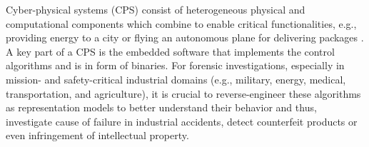 \documentclass[10pt,conference]{IEEEtran}
\renewcommand{\hl}[1]{#1}
\newcommand{\citeme}[1]{%
  \begingroup
  \definecolor{hlcolor}{RGB}{255, 226, 176}\sethlcolor{hlcolor}%
  [\textcolor{orange}{\hl{\textbf{CITE}}}]%
  \endgroup
}
\begin{document}
Cyber-physical systems (CPS) consist of heterogeneous physical and computational components which combine to enable critical functionalities, e.g., providing energy to a city or flying an autonomous plane for delivering packages \cite{barrere2021analysing}. A key part of a CPS is the embedded software that implements the control algorithms and is in form of binaries.
For forensic investigations, especially in mission- and safety-critical industrial domains (e.g., military, energy, medical, transportation, and agriculture), it is crucial to reverse-engineer these algorithms as representation models to better understand their behavior and thus, investigate cause of failure in industrial accidents, detect counterfeit products or even infringement of intellectual property. %
%
%
%
%
\end{document}
